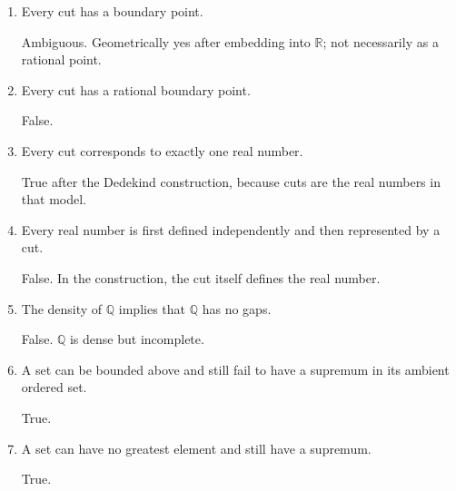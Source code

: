\documentclass{essay}
\begin{document}
\begin{enumerate}[label=\arabic*., itemsep=10pt]
\begin{answer}
True after $\mathbb{R}$ has been constructed and proved complete.
\end{answer}

\item Every cut has a boundary point.

\begin{answer}
Ambiguous. Geometrically yes after embedding into $\mathbb{R}$; not necessarily as a rational point.
\end{answer}

\item Every cut has a rational boundary point.

\begin{answer}
False.
\end{answer}

\item Every cut corresponds to exactly one real number.

\begin{answer}
True after the Dedekind construction, because cuts are the real numbers in that model.
\end{answer}

\item Every real number is first defined independently and then represented by a cut.

\begin{answer}
False. In the construction, the cut itself defines the real number.
\end{answer}

\item The density of $\mathbb{Q}$ implies that $\mathbb{Q}$ has no gaps.

\begin{answer}
False. $\mathbb{Q}$ is dense but incomplete.
\end{answer}

\item A set can be bounded above and still fail to have a supremum in its ambient ordered set.

\begin{answer}
True.
\end{answer}

\item A set can have no greatest element and still have a supremum.

\begin{answer}
True.
\end{answer}


\end{enumerate}
\end{document}
